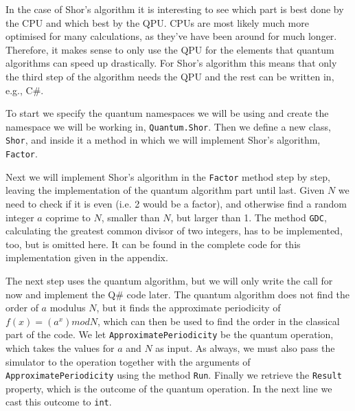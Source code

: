 In the case of Shor's algorithm it is interesting to see which part is best done by the CPU and which best by the QPU. CPUs are most likely much more optimised for many calculations, as they've have been around for much longer. Therefore, it makes sense to only use the QPU for the elements that quantum algorithms can speed up drastically. For Shor's algorithm this means that only the third step of the algorithm needs the QPU and the rest can be written in, e.g., C\#. 

To start we specify the quantum namespaces we will be using and create the namespace we will be working in, \texttt{Quantum.Shor}. Then we define a new class, \texttt{Shor}, and inside it a method in which we will implement Shor's algorithm, \texttt{Factor}. 



Next we will implement Shor's algorithm in the \texttt{Factor} method step by step, leaving the implementation of the quantum algorithm part until last. Given $N$ we need to check if it is even (i.e. 2 would be a factor), and otherwise find a random integer $a$ coprime to $N$, smaller than $N$, but larger than 1. The method \texttt{GDC}, calculating the greatest common divisor of two integers, has to be implemented, too, but is omitted here. It can be found in the complete code for this implementation given in the appendix.



The next step uses the quantum algorithm, but we will only write the call for now and implement the Q\# code later. The quantum algorithm does not find the order of $a$ modulus $N$, but it finds the approximate periodicity of $f(x) = (a^x)mod N$, which can then be used to find the order in the classical part of the code. We let \texttt{ApproximatePeriodicity} be the quantum operation, which takes the values for $a$ and $N$ as input. As always, we must also pass the simulator to the operation together with the arguments of \texttt{ApproximatePeriodicity} using the method \texttt{Run}. Finally we retrieve the \texttt{Result} property, which is the outcome of the quantum operation. In the next line we cast this outcome to \texttt{int}.\\



